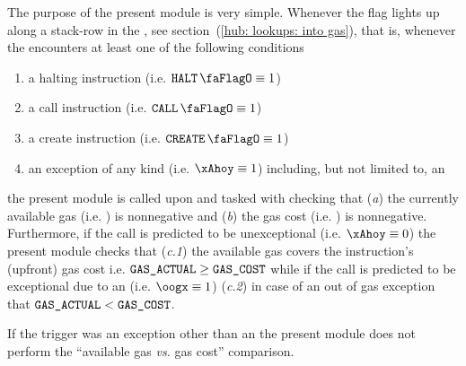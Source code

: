 The purpose of the present \gasMod{} module is very simple.
Whenever the \CONTEXTMAYCHANGE{} flag lights up along a stack-row in the \hubMod{},
see section~(\ref{hub: lookups: into gas}), that is, whenever the \hubMod{} encounters at least one of the following conditions
\begin{enumerate}
	\item a halting instruction (i.e. $\haltFlag \equiv 1$)
        \item a call instruction (i.e. $\callFlag \equiv 1$)
        \item a create instruction (i.e. $\createFlag \equiv 1$)
	\item an exception of any kind (i.e. $\xAhoy \equiv 1$) including, but not limited to, an \oogxSH{}
\end{enumerate}
the present module is called upon and tasked with checking that
(\emph{a}) the currently available gas (i.e. \gasActual{}) is nonnegative and
(\emph{b}) the gas cost (i.e. \gasActual{}) is nonnegative. %
Furthermore, if the call is predicted to be unexceptional (i.e. $\xAhoy \equiv 0$) the present module checks that
(\emph{c.1}) the available gas covers the instruction's (upfront) gas cost i.e. $\texttt{GAS}\texttt{\_ACTUAL} \geq \texttt{GAS}\texttt{\_COST}$ while
if the call is predicted to be exceptional due to an \oogxSH{} (i.e. $\oogx \equiv 1$) 
(\emph{c.2}) in case of an out of gas exception that $\texttt{GAS}\texttt{\_ACTUAL} < \texttt{GAS}\texttt{\_COST}$.

\saNote{} If the trigger was an exception other than an \oogxSH{} the present module does not perform the ``available gas \emph{vs.} gas cost'' comparison.
